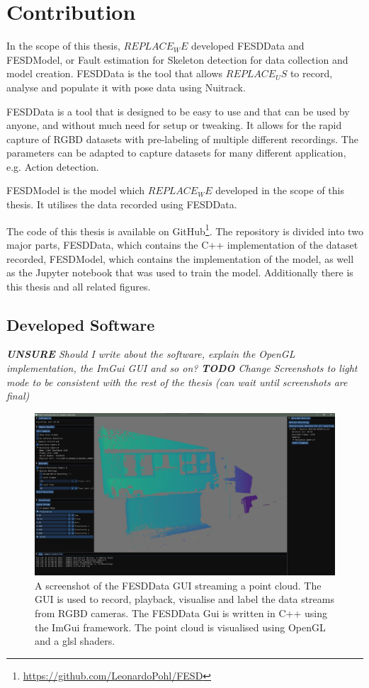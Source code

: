 \section{Contribution}
\label{sec:contribution}

In the scope of this thesis, $REPLACE_WE$ developed FESDData and FESDModel, or Fault estimation for Skeleton detection for data collection and model creation. FESDData is the tool that allows $REPLACE_US$ to record, analyse and populate it with pose data using Nuitrack. 

FESDData is a tool that is designed to be easy to use and that can be used by anyone, and without much need for setup or tweaking. It allows for the rapid capture of RGBD datasets with pre-labeling of multiple different recordings. The parameters can be adapted to capture datasets for many different application, e.g. Action detection.

FESDModel is the model which $REPLACE_WE$ developed in the scope of this thesis. It utilises the data recorded using FESDData.

The code of this thesis is available on GitHub\footnote{\url{https://github.com/LeonardoPohl/FESD}}. The repository is divided into two major parts, FESDData, which contains the C++ implementation of the dataset recorded, FESDModel, which contains the implementation of the model, as well as the Jupyter notebook that was used to train the model. Additionally there is this thesis and all related figures.

\subsection{Developed Software}

\textit{\textbf{UNSURE} Should I write about the software, explain the OpenGL implementation, the ImGui GUI and so on?}
\textit{\textbf{TODO} Change Screenshots to light mode to be consistent with the rest of the thesis (can wait until screenshots are final)}

\begin{figure}[ht]
  \centering
  \includegraphics[width=\linewidth]{figures/FESD/all.png}
  \caption[FESDData GUI]{A screenshot of the FESDData GUI streaming a point cloud. The GUI is used to record, playback, visualise and label the data streams from RGBD cameras. The FESDData Gui is written in C++ using the ImGui framework. The point cloud is visualised using OpenGL and a glsl shaders.}
  \label{fig:stream_gui}
\end{figure}

